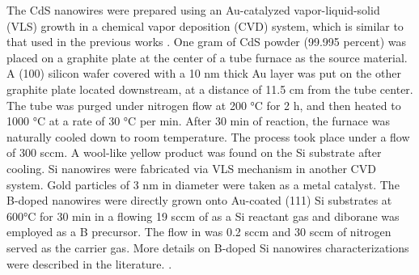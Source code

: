 The CdS nanowires were prepared using an Au-catalyzed vapor-liquid-solid (VLS) growth  in a chemical vapor deposition (CVD) system, which is similar to that used in the previous works \cite{zhang2014photosensing,577926461}. One gram of CdS powder (99.995 percent) was placed on a graphite plate at the center of a tube furnace as the source material. A (100) silicon wafer covered with a 10 nm thick Au layer was put on the other graphite plate located downstream, at a distance of 11.5 cm from the tube center. The tube was purged under nitrogen flow at 200 °C for 2 h, and then heated to 1000 °C at a rate of 30 °C per min. After 30 min of reaction, the furnace was naturally cooled down to room temperature. The process took place under a  flow of 300 sccm. A wool-like yellow product was found on the Si substrate after cooling. 
Si nanowires were fabricated via VLS mechanism in another CVD system. Gold particles of 3 nm in diameter were taken as a metal catalyst. The B-doped nanowires were directly grown onto Au-coated (111) Si substrates at 600°C for 30 min in a flowing 19 sccm of  as a Si reactant gas and diborane  was employed as a B precursor. The  flow in  was 0.2 sccm and 30 sccm of nitrogen  served as the carrier gas. More details on B-doped Si nanowires characterizations were described in the literature. \cite{577926462,577926464,577926465}.

